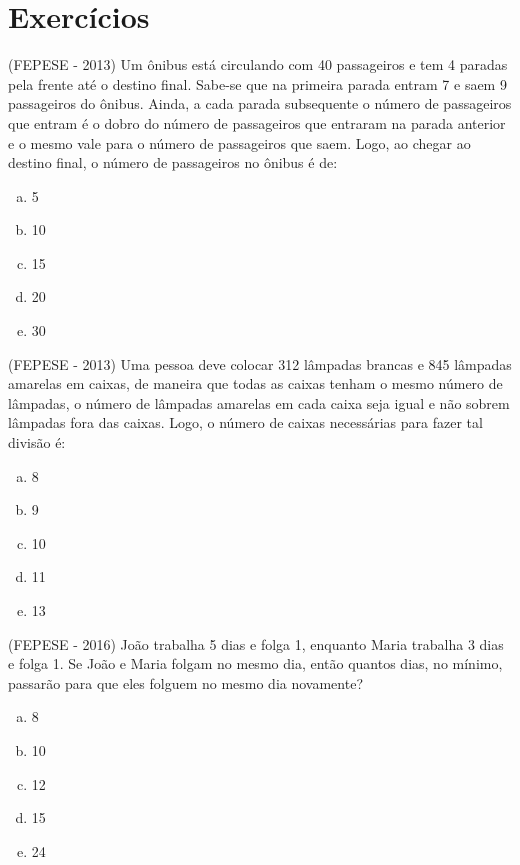  \section{Exercícios}
 \begin{exer}
 (FEPESE - 2013) Um ônibus está circulando com 40 passageiros e tem 4 paradas pela frente até o destino final. Sabe-se que na primeira parada entram 7 e saem 9 passageiros do ônibus. Ainda, a cada parada subsequente o número de passageiros que entram é o dobro do número de passageiros que entraram na parada anterior e o mesmo vale para o número de passageiros que saem. Logo, ao chegar ao destino final, o número de passageiros no ônibus é de:
 \begin{enumerate}[a)]
 \item 5
 \item 10
 \item 15
 \item 20
 \item 30
 \end{enumerate}
 \end{exer}
 
 \begin{exer}
 (FEPESE - 2013) Uma pessoa deve colocar 312 lâmpadas brancas e 845 lâmpadas amarelas em caixas, de maneira que todas as caixas tenham o mesmo número de lâmpadas, o número de lâmpadas amarelas em cada caixa seja igual e não sobrem lâmpadas fora das caixas. Logo, o número de caixas necessárias para fazer tal divisão é:
  \begin{enumerate}[a)]
  \item 8
  \item 9
  \item 10
  \item 11
  \item 13
  \end{enumerate}
 \end{exer}
 
 \begin{exer}
 (FEPESE - 2016) João trabalha 5 dias e folga 1, enquanto Maria trabalha 3 dias e folga 1. Se João e Maria folgam no mesmo dia, então quantos dias, no mínimo, passarão para que eles folguem no mesmo dia novamente?
  \begin{enumerate}[a)]
  \item 8
  \item 10
  \item 12
  \item 15
  \item 24
  \end{enumerate}
 \end{exer}
 
